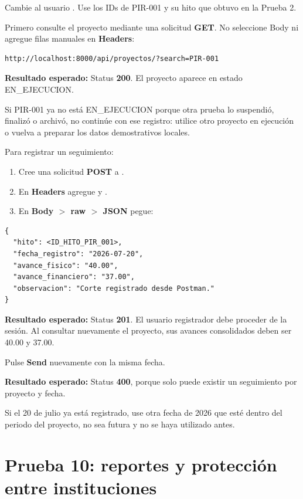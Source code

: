 \documentclass[11pt,a4paper]{article}
\newcommand{\esperado}[1]{\textcolor{VerdeResultado}{\textbf{Resultado esperado:}} #1}
\begin{document}
Cambie al usuario . Use los IDs de PIR-001 y su hito que obtuvo en la Prueba 2.

Primero consulte el proyecto mediante una solicitud \textbf{GET}. No seleccione Body ni agregue filas manuales en \textbf{Headers}:

\begin{lstlisting}
http://localhost:8000/api/proyectos/?search=PIR-001
\end{lstlisting}

\esperado{Status \textbf{200}. El proyecto aparece en estado EN\_EJECUCION.}

Si PIR-001 ya no está EN\_EJECUCION porque otra prueba lo suspendió, finalizó o archivó, no continúe con ese registro: utilice otro proyecto en ejecución o vuelva a preparar los datos demostrativos locales.

Para registrar un seguimiento:

\begin{enumerate}
  \item Cree una solicitud \textbf{POST} a .
  \item En \textbf{Headers} agregue  y .
  \item En \textbf{Body $>$ raw $>$ JSON} pegue:
\end{enumerate}

\begin{lstlisting}
{
  "hito": <ID_HITO_PIR_001>,
  "fecha_registro": "2026-07-20",
  "avance_fisico": "40.00",
  "avance_financiero": "37.00",
  "observacion": "Corte registrado desde Postman."
}
\end{lstlisting}

\esperado{Status \textbf{201}. El usuario registrador debe proceder de la sesión. Al consultar nuevamente el proyecto, sus avances consolidados deben ser 40.00 y 37.00.}

Pulse \textbf{Send} nuevamente con la misma fecha.

\esperado{Status \textbf{400}, porque solo puede existir un seguimiento por proyecto y fecha.}

Si el 20 de julio ya está registrado, use otra fecha de 2026 que esté dentro del periodo del proyecto, no sea futura y no se haya utilizado antes.

\section{Prueba 10: reportes y protección entre instituciones}
\end{document}
